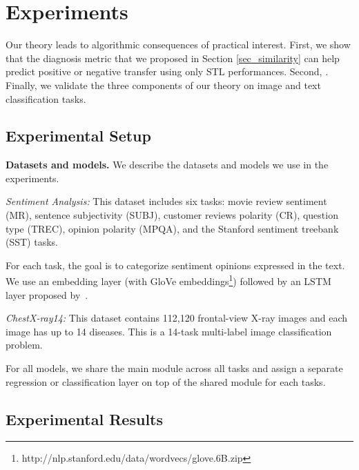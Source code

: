 \section{Experiments}

Our theory leads to algorithmic consequences of practical interest.
First, we show that the diagnosis metric that we proposed in Section \ref{sec_similarity} can help predict positive or negative transfer using only STL performances.
Second, \todo{}.
Finally, we validate the three components of our theory on image and text classification tasks.

\subsection{Experimental Setup}

{\bf Datasets and models.} We describe the datasets and models we use in the experiments.

{\it Sentiment Analysis:} This dataset includes six tasks: movie review sentiment (MR), sentence subjectivity (SUBJ), customer reviews polarity (CR), question type (TREC), opinion polarity (MPQA), and the Stanford sentiment treebank (SST) tasks.

{For each task, the goal is to categorize sentiment opinions expressed in the text.
We use an embedding layer (with GloVe embeddings\footnote{http://nlp.stanford.edu/data/wordvecs/glove.6B.zip}) followed by an LSTM layer proposed by~\cite{lei2018simple}.
}

{\it ChestX-ray14:} This dataset contains 112,120 frontal-view X-ray images and each image has up to 14 diseases.
This is a 14-task multi-label image classification problem.

For all models, we share the main module across all tasks and assign a separate regression or classification layer on top of the shared module for each tasks.

\subsection{Experimental Results}

